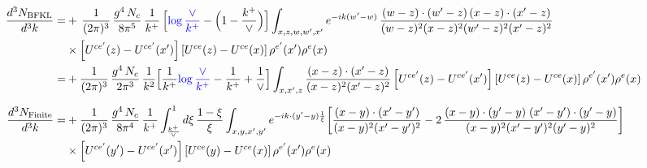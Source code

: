 \documentclass[9pt]{article}
\numberwithin{equation}{section}
\begin{document}
\begin{align}
\frac{d^{3}N_{\rm BFKL}}{d^{3}k}= &    +\,\frac{1}{(2\pi)^{3}}\,\frac{g^{4}\,N_{c}}{8\pi^{5}}\,\frac{1}{k^{+}}\,\Big[{\color{blue}\log\frac{\vee}{k^{+}}}-\Big(1-\frac{k^{+}}{\vee}\Big)\Big]\int_{x,z,w,w',x'}e^{-ik(w'-w)}\,\frac{(w-z)\cdot (w'-z)\,(x-z)\cdot (x'-z)}{(w-z)^{2}(x-z)^{2}(w'-z)^{2}(x'-z)^{2}}\notag\\
&\times\left[U^{ce'}(z) - U^{ce'}(x')\right]\left[U^{ce}(z) - U^{ce}(x)\right]\rho^{e'}(x') \rho^{e}(x)\notag \\
= & +\frac{1}{(2\pi)^{3}}\,\frac{g^{4}\,N_{c}}{2\pi^{3}}\,\frac{1}{k^{2}}\Big[\frac{1}{k^{+}}{\color{blue}\log\frac{\vee}{k^{+}}}-\frac{1}{k^{+}}+\frac{1}{\vee}\Big]\int_{x,x',z}\frac{(x-z)\cdot(x'-z)}{(x-z)^{2}(x'-z)^{2}}\left[U^{ce'}(z) - U^{ce'}(x')\right]\left[U^{ce}(z) - U^{ce}(x)\right]\rho^{e'}(x')\rho^{e}(x)\\[6pt]
\frac{d^{3}N_{\rm Finite}}{d^{3}k}= &  +\frac{1}{(2\pi)^{3}}\,\frac{g^{4}\,N_{c}}{8\pi^{4}}\,\frac{1}{k^{+}}\int_{\frac{k^{+}}{\vee}}^{1}d\xi\,\frac{1-\xi}{\xi}\int_{x,y,x',y'}e^{-ik\cdot(y'-y)\frac{1}{\xi}}\bigg[\frac{(x-y)\cdot(x'-y')}{(x-y)^{2}(x'-y')^{2}}-2\,\frac{(x-y)\cdot(y'-y)\;(x'-y')\cdot(y'-y)}{(x-y)^{2}(x'-y')^{2}(y'-y)^{2}}\bigg]\notag\\
&\times\left[U^{ce'}(y') - U^{ce'}(x')\right]\left[U^{ce}(y) - U^{ce}(x)\right]\rho^{e'}(x')\rho^{e}(x)
\end{align}
\end{document}
